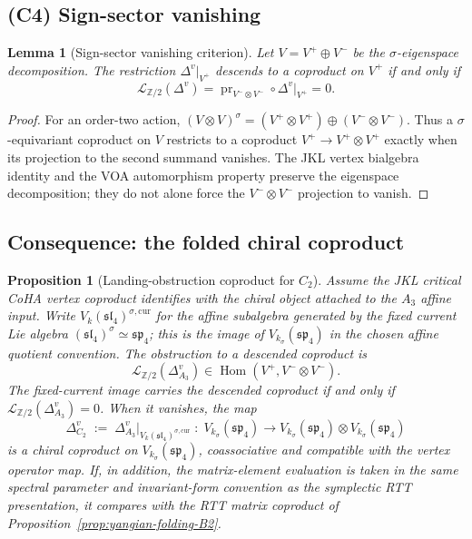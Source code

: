 \documentclass[11pt]{amsart}
\newtheorem{lemma}[theorem]{Lemma}
\newtheorem{proposition}[theorem]{Proposition}
\theoremstyle{definition}
\theoremstyle{remark}
\providecommand{\fsl}{\mathfrak{sl}}
\providecommand{\fsp}{\mathfrak{sp}}
\begin{document}
\subsection*{(C4) Sign-sector vanishing}

\begin{lemma}[Sign-sector vanishing criterion]%
\label{lem:sign-sector-vanishing}%
Let $V=V^+\oplus V^-$ be the $\sigma$-eigenspace decomposition. The
restriction $\Delta^v|_{V^+}$ descends to a coproduct on $V^+$ if and
only if
\[
  \mathcal L_{\mathbb Z/2}(\Delta^v)
  =
  \operatorname{pr}_{V^-\otimes V^-}\circ \Delta^v|_{V^+}
  =0 .
\]
\end{lemma}

\begin{proof}
For an order-two action,
$(V\otimes V)^\sigma=(V^+\otimes V^+)\oplus(V^-\otimes V^-)$. Thus a
$\sigma$-equivariant coproduct on $V$ restricts to a coproduct
$V^+\to V^+\otimes V^+$ exactly when its projection to the second
summand vanishes. The JKL vertex bialgebra identity and the VOA
automorphism property preserve the eigenspace decomposition; they do
not alone force the $V^-\otimes V^-$ projection to vanish.
\end{proof}

\subsection*{Consequence: the folded chiral coproduct}

\begin{proposition}[Landing-obstruction coproduct for $C_2$]%
\label{prop:folded-chiral-B2}%
Assume the JKL critical CoHA vertex coproduct identifies with the
chiral object attached to the $A_3$ affine input. Write
$V_k(\fsl_4)^{\sigma,\mathrm{cur}}$ for the affine subalgebra
generated by the fixed current Lie algebra
$(\fsl_4)^\sigma\simeq\fsp_4$; this is the image of
$V_{k_\sigma}(\fsp_4)$ in the chosen affine quotient convention. The
obstruction to a descended coproduct is
\[
  \mathcal L_{\mathbb Z/2}(\Delta^v_{A_3})
  \in
  \operatorname{Hom}(V^+,V^-\otimes V^-).
\]
The fixed-current image carries the descended coproduct if and only if
$\mathcal L_{\mathbb Z/2}(\Delta^v_{A_3})=0$. When it vanishes, the map
\[
  \Delta^{v}_{C_2} \;:=\; \Delta^{v}_{A_3}\big|_{V_k(\fsl_4)^{\sigma,\mathrm{cur}}}
  \;:\;
  V_{k_\sigma}(\fsp_4) \longrightarrow
  V_{k_\sigma}(\fsp_4) \otimes V_{k_\sigma}(\fsp_4)
\]
is a chiral coproduct on $V_{k_\sigma}(\fsp_4)$, coassociative and
compatible with the vertex operator map. If, in addition, the
matrix-element evaluation is taken in the same spectral parameter and
invariant-form convention as the symplectic RTT presentation, it
compares with the RTT matrix coproduct of
Proposition~\ref{prop:yangian-folding-B2}.
\end{proposition}
\end{document}
